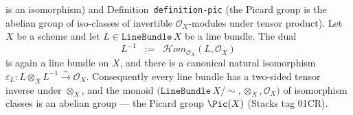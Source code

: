 \begin{lemma}
{  is an isomorphism) and Definition~\texttt{definition-pic} (the Picard group is
  the abelian group of iso-classes of invertible \(\mathcal{O}_X\)-modules under
  tensor product).}
  Let \(X\) be a scheme and let \(L \in \texttt{LineBundle}\,X\) be a line
  bundle. The dual
  \[
    L^{-1} \;\;:=\;\; \mathcal{H}om_{\mathcal{O}_X}(L, \mathcal{O}_X)
  \]
  is again a line bundle on \(X\), and there is a canonical natural
  isomorphism
  \(\varepsilon_L : L \otimes_X L^{-1} \xrightarrow{\sim} \mathcal{O}_X\).
  Consequently every line bundle has a two-sided tensor inverse under
  \(\otimes_X\), and the monoid \(\bigl(\texttt{LineBundle}\,X / \sim, \otimes_X,
  \mathcal{O}_X\bigr)\) of isomorphism classes is an abelian group ---
  the Picard group \(\Pic(X)\) (Stacks tag 01CR).
\end{lemma}

